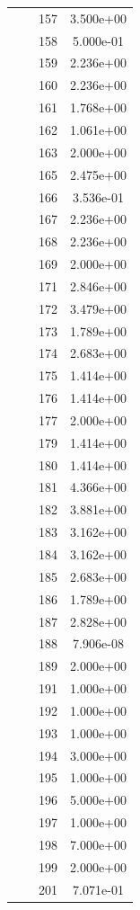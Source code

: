 \documentclass[12pt]{article}
\begin{document}
\begin{longtable}{@{}cccc@{}}
 &  & 157 & 3.500e+00 \\
 &  & 158 & 5.000e-01 \\
 &  & 159 & 2.236e+00 \\
 &  & 160 & 2.236e+00 \\
 &  & 161 & 1.768e+00 \\
 &  & 162 & 1.061e+00 \\
 &  & 163 & 2.000e+00 \\
 &  & 165 & 2.475e+00 \\
 &  & 166 & 3.536e-01 \\
 &  & 167 & 2.236e+00 \\
 &  & 168 & 2.236e+00 \\
 &  & 169 & 2.000e+00 \\
 &  & 171 & 2.846e+00 \\
 &  & 172 & 3.479e+00 \\
 &  & 173 & 1.789e+00 \\
 &  & 174 & 2.683e+00 \\
 &  & 175 & 1.414e+00 \\
 &  & 176 & 1.414e+00 \\
 &  & 177 & 2.000e+00 \\
 &  & 179 & 1.414e+00 \\
 &  & 180 & 1.414e+00 \\
 &  & 181 & 4.366e+00 \\
 &  & 182 & 3.881e+00 \\
 &  & 183 & 3.162e+00 \\
 &  & 184 & 3.162e+00 \\
 &  & 185 & 2.683e+00 \\
 &  & 186 & 1.789e+00 \\
 &  & 187 & 2.828e+00 \\
 &  & 188 & 7.906e-08 \\
 &  & 189 & 2.000e+00 \\
 &  & 191 & 1.000e+00 \\
 &  & 192 & 1.000e+00 \\
 &  & 193 & 1.000e+00 \\
 &  & 194 & 3.000e+00 \\
 &  & 195 & 1.000e+00 \\
 &  & 196 & 5.000e+00 \\
 &  & 197 & 1.000e+00 \\
 &  & 198 & 7.000e+00 \\
 &  & 199 & 2.000e+00 \\
 &  & 201 & 7.071e-01 \\

\end{longtable}
\end{document}
